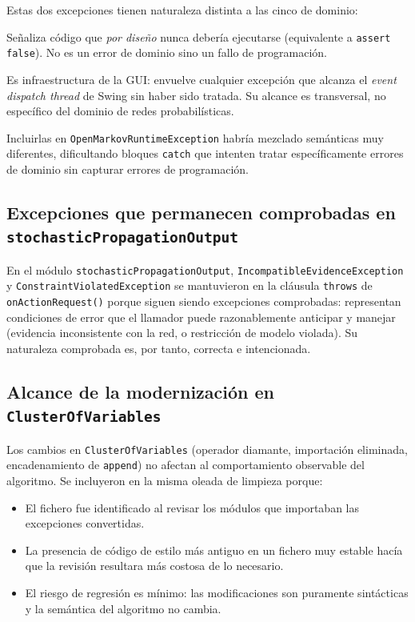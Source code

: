 \documentclass[12pt,a4paper]{article}
\begin{document}
Estas dos excepciones tienen naturaleza distinta a las cinco de dominio:

\begin{description}[leftmargin=2em]
  \item[\texttt{UnreachableException}] Señaliza código que \emph{por diseño}
    nunca debería ejecutarse (equivalente a \texttt{assert false}). No es un
    error de dominio sino un fallo de programación.
  \item[\texttt{UnrecoverableException}] Es infraestructura de la GUI: envuelve
    cualquier excepción que alcanza el \textit{event dispatch thread} de Swing
    sin haber sido tratada. Su alcance es transversal, no específico del dominio
    de redes probabilísticas.
\end{description}

Incluirlas en \texttt{OpenMarkovRuntimeException} habría mezclado semánticas muy
diferentes, dificultando bloques \texttt{catch} que intenten tratar
específicamente errores de dominio sin capturar errores de programación.

\subsection{Excepciones que permanecen comprobadas en \\\texttt{stochasticPropagationOutput}}

En el módulo \texttt{stochasticPropagationOutput}, \texttt{IncompatibleEvidenceException}
y \texttt{ConstraintViolatedException} se mantuvieron en la cláusula
\texttt{throws} de \texttt{onActionRequest()} porque siguen siendo excepciones
comprobadas: representan condiciones de error que el llamador puede
razonablemente anticipar y manejar (evidencia inconsistente con la red, o
restricción de modelo violada). Su naturaleza comprobada es, por tanto,
correcta e intencionada.

\subsection{Alcance de la modernización en \texttt{ClusterOfVariables}}

Los cambios en \texttt{ClusterOfVariables} (operador diamante, importación
eliminada, encadenamiento de \texttt{append}) no afectan al comportamiento
observable del algoritmo. Se incluyeron en la misma oleada de limpieza porque:

\begin{itemize}
  \item El fichero fue identificado al revisar los módulos que importaban las
    excepciones convertidas.
  \item La presencia de código de estilo más antiguo en un fichero muy estable
    hacía que la revisión resultara más costosa de lo necesario.
  \item El riesgo de regresión es mínimo: las modificaciones son puramente
    sintácticas y la semántica del algoritmo no cambia.
\end{itemize}
\end{document}
